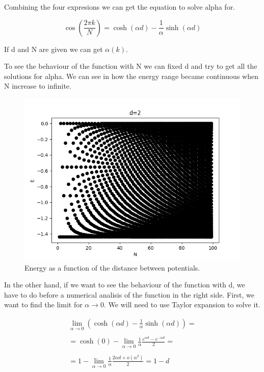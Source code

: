 Combining the four expresions we can get the equation to solve alpha for.

\begin{equation}
  \label{5.23}
  \cos{\left(\frac{2\pi k}{N}\right)} = \cosh{(\alpha d)} - \frac{1}{\alpha} \sinh{(\alpha d)}
\end{equation}

If d and N are given we can get $\alpha(k)$.

To see the behaviour of the function with N we can fixed d and try to get all the solutions for alpha. We can see in  how the energy range became continuous when N increase to infinite.

\begin{figure}[H]
  \includegraphics{images5/E_d=2_N.png}
  \centering
  \caption{Energy as a function of the distance between potentials.}
\end{figure}

In the other hand, if we want to see the behaviour of the function with d, we have to do before a numerical analisis of the function in the right side. First, we want to find the limit for $\alpha \to 0$. We will need to use Taylor expansion to solve it.

\begin{equation}
  \label{5.24}
  \begin{array}{c}
    \lim_{\alpha \to 0} (\cosh{(\alpha d)} - \frac{1}{\alpha} \sinh{(\alpha d)}) =
    \\

    \\
    = \cosh{(0)} - \lim_{\alpha \to 0} \frac{1}{\alpha} \frac{e^{\alpha d}-e^{-\alpha d}}{2} =
    \\

    \\
    = 1 - \lim_{\alpha \to 0} \frac{1}{\alpha} \frac{2\alpha d + o(\alpha^2)}{2} = 1-d
  \end{array}
\end{equation}

